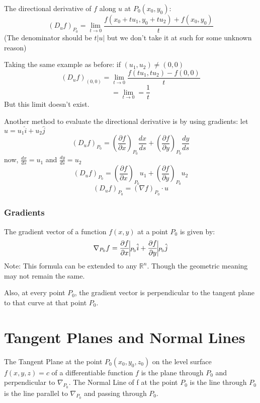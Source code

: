 \documentclass{article}
\begin{document}
The directional derivative of $f$ along $u$ at $P_0(x_0, y_0)$:
\[ \left(D_u f\right)_{P_0} = \lim_{t \rightarrow 0} \frac{f\left(x_0 + tu_1, y_0 + tu_2\right) + f\left(x_0, y_0\right)}{t}\]
(The denominator should be $t|u|$ but we don't take it at such for some unknown reason)

Taking the same example as before:
if $(u_1, u_2) \neq (0,0)$
\[ \left(D_u f\right)_{(0,0)} = \lim_{t \rightarrow 0} \frac{f\left(tu_1, tu_2\right) - f(0,0)}{t}\]
\[ = \lim_{t \rightarrow 0} = \frac{1}{t}\]
But this limit doesn't exist.

Another method to evaluate the directional derivative is by using gradients:
let $u = u_1 \hat{i} + u_2 \hat{j}$
\[ \left( D_u f\right)_{P_0} = \left(\frac{\partial f}{\partial x}\right)_{P_0} \frac{dx}{ds} + \left( \frac{\partial f}{\partial y} \right)_{P_0} \frac{dy}{ds} \]
now, $\frac{dx}{ds} = u_1$ and $\frac{dy}{ds} = u_2$
\[ \left( D_u f\right)_{P_0} = \left(\frac{\partial f}{\partial x}\right)_{P_0} u_1 + \left(\frac{\partial f}{\partial y}\right)_{P_0} u_2 \]
\[ \left( D_u f\right)_{P_0} = (\nabla f)_{P_0} \cdot u \]

\subsubsection{Gradients}
The gradient vector of a function $f(x,y)$ at a point $P_0$ is given by:
\[ \nabla_{P_0} f = \frac{\partial f}{\partial x} \vline_{P_0} \hat{i} + \frac{\partial f}{\partial y} \vline_{P_0} \hat{j} \]
Note: This formula can be extended to any $\mathbb{R}^n$. Though the geometric meaning may not remain the same.

Also, at every point $P_0$, the gradient vector is perpendicular to the tangent plane to that curve at that point $P_0$.

\section{Tangent Planes and Normal Lines}
The Tangent Plane at the point $P_0(x_0, y_0, z_0)$ on the level surface $f(x,y,z) = c$ of a differentiable function $f$ is the plane through $P_0$ and perpendicular to $\nabla_{P_0}$.
The Normal Line of f at the point $P_0$ is the line through $P_0$ is the line parallel to $\nabla_{P_0}$ and passing through $P_0$.
\end{document}
